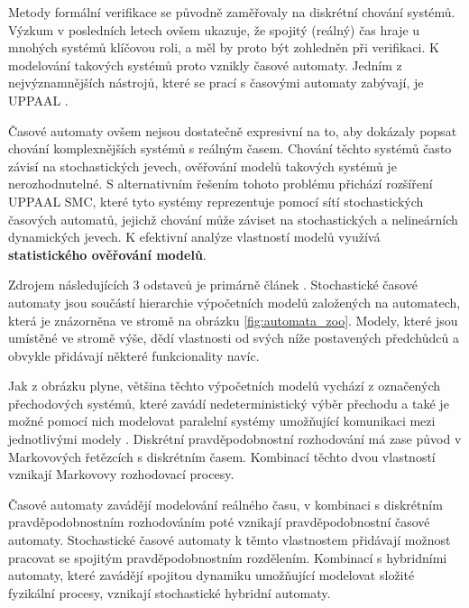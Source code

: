 Metody formální verifikace se původně zaměřovaly na diskrétní chování systémů. Výzkum v posledních letech ovšem ukazuje, že spojitý (reálný) čas hraje u mnohých systémů klíčovou roli, a měl by proto být zohledněn při verifikaci. K modelování takových systémů proto vznikly časové automaty. Jedním z nejvýznamnějších nástrojů, které se prací s časovými automaty zabývají, je UPPAAL \cite{uppaal_smc}.

Časové automaty ovšem nejsou dostatečně expresivní na to, aby dokázaly popsat chování komplexnějších systémů s reálným časem. Chování těchto systémů často závisí na stochastických jevech, ověřování modelů takových systémů je nerozhodnutelné. S alternativním řešením tohoto problému přichází rozšíření UPPAAL SMC, které tyto systémy reprezentuje pomocí sítí stochastických časových automatů, jejichž chování může záviset na stochastických a nelineárních dynamických jevech. K efektivní analýze vlastností modelů využívá \textbf{statistického ověřování modelů}.

Zdrojem následujících 3 odstavců je primárně článek \cite{automata_zoo}. Stochastické časové automaty jsou součástí hierarchie výpočetních modelů založených na automatech, která je znázorněna ve stromě na obrázku \ref{fig:automata_zoo}. Modely, které jsou umístěné ve stromě výše, dědí vlastnosti od svých níže postavených předchůdců a obvykle přidávají některé funkcionality navíc.

Jak z obrázku plyne, většina těchto výpočetních modelů vychází z označených přechodových systémů, které zavádí nedeterministický výběr přechodu a také je možné pomocí nich modelovat paralelní systémy umožňující komunikaci mezi jednotlivými modely \cite{mc_principles}. Diskrétní pravděpodobnostní rozhodování má zase původ v Markovových řetězcích s diskrétním časem. Kombinací těchto dvou vlastností vznikají Markovovy rozhodovací procesy. 

Časové automaty zavádějí modelování reálného času, v kombinaci s diskrétním pravděpodobnostním rozhodováním poté vznikají pravděpodobnostní časové automaty. Stochastické časové automaty k těmto vlastnostem přidávají možnost pracovat se spojitým pravděpodobnostním rozdělením. Kombinací s hybridními automaty, které zavádějí spojitou dynamiku umožňující modelovat složité fyzikální procesy, vznikají stochastické hybridní automaty.

